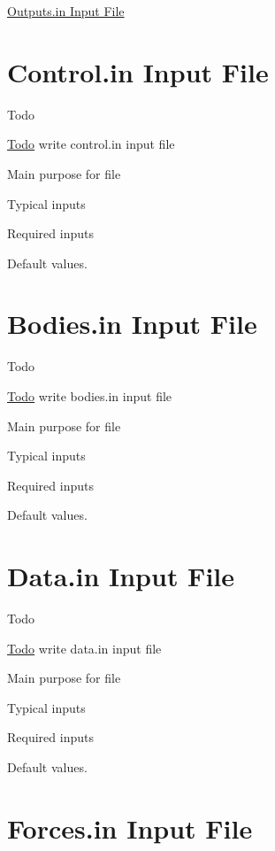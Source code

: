 \hyperlink{in_outputs}{Outputs.\-in Input File} \hypertarget{in_control}{}\section{Control.\-in Input File}\label{in_control}
\begin{DoxyRefDesc}{Todo}
\item[\hyperlink{todo__todo000007}{Todo}]write control.\-in input file
\begin{DoxyItemize}
\item Main purpose for file
\item Typical inputs
\item Required inputs
\item Default values.
\end{DoxyItemize}\end{DoxyRefDesc}
\hypertarget{in_bodies}{}\section{Bodies.\-in Input File}\label{in_bodies}
\begin{DoxyRefDesc}{Todo}
\item[\hyperlink{todo__todo000006}{Todo}]write bodies.\-in input file
\begin{DoxyItemize}
\item Main purpose for file
\item Typical inputs
\item Required inputs
\item Default values.
\end{DoxyItemize}\end{DoxyRefDesc}
\hypertarget{in_data}{}\section{Data.\-in Input File}\label{in_data}
\begin{DoxyRefDesc}{Todo}
\item[\hyperlink{todo__todo000008}{Todo}]write data.\-in input file
\begin{DoxyItemize}
\item Main purpose for file
\item Typical inputs
\item Required inputs
\item Default values.
\end{DoxyItemize}\end{DoxyRefDesc}
\hypertarget{in_forces}{}\section{Forces.\-in Input File}\label{in_forces}
